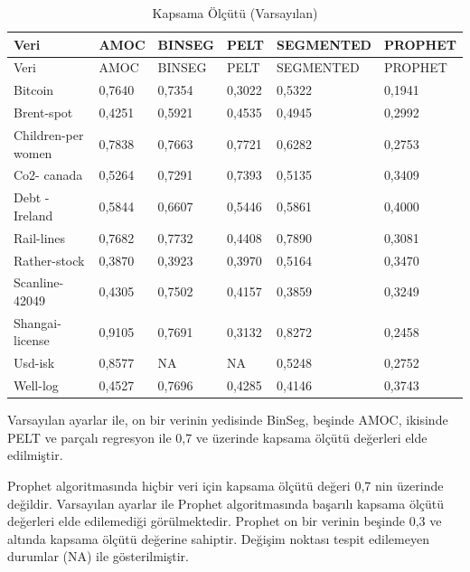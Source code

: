 \documentclass[12pt,twoside]{deuthesis}
\begin{document}
\begin{longtable}[]{@{}llllll@{}}
\caption{\label{tab:nvar3} Kapsama Ölçütü (Varsayılan)}\tabularnewline
\toprule\noalign{}
Veri & AMOC & BINSEG & PELT & SEGMENTED & PROPHET \\
\midrule\noalign{}
\endfirsthead
\toprule\noalign{}
Veri & AMOC & BINSEG & PELT & SEGMENTED & PROPHET \\
\midrule\noalign{}
\endhead
\bottomrule\noalign{}
\endlastfoot
Bitcoin & 0,7640 & 0,7354 & 0,3022 & 0,5322 & 0,1941 \\
Brent-spot & 0,4251 & 0,5921 & 0,4535 & 0,4945 & 0,2992 \\
Children-per women & 0,7838 & 0,7663 & 0,7721 & 0,6282 & 0,2753 \\
Co2- canada & 0,5264 & 0,7291 & 0,7393 & 0,5135 & 0,3409 \\
Debt -Ireland & 0,5844 & 0,6607 & 0,5446 & 0,5861 & 0,4000 \\
Rail-lines & 0,7682 & 0,7732 & 0,4408 & 0,7890 & 0,3081 \\
Rather-stock & 0,3870 & 0,3923 & 0,3970 & 0,5164 & 0,3470 \\
Scanline-42049 & 0,4305 & 0,7502 & 0,4157 & 0,3859 & 0,3249 \\
Shangai-license & 0,9105 & 0,7691 & 0,3132 & 0,8272 & 0,2458 \\
Usd-isk & 0,8577 & NA & NA & 0,5248 & 0,2752 \\
Well-log & 0,4527 & 0,7696 & 0,4285 & 0,4146 & 0,3743 \\
\end{longtable}

Varsayılan ayarlar ile, on bir verinin yedisinde BinSeg, beşinde AMOC, ikisinde PELT ve parçalı regresyon ile 0,7 ve üzerinde kapsama ölçütü değerleri elde edilmiştir.

Prophet algoritmasında hiçbir veri için kapsama ölçütü değeri 0,7 nin üzerinde değildir.
Varsayılan ayarlar ile Prophet algoritmasında başarılı kapsama ölçütü değerleri elde edilemediği görülmektedir. Prophet on bir verinin beşinde 0,3 ve altında kapsama ölçütü değerine sahiptir.
Değişim noktası tespit edilemeyen durumlar (NA) ile gösterilmiştir.
\end{document}
